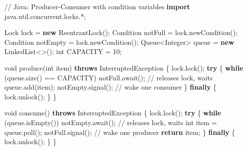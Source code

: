 \documentclass[11pt]{article}
\newenvironment{Shaded}{\begin{snugshade}}{\end{snugshade}}
\newcommand{\BuiltInTok}[1]{\textcolor[rgb]{0.50,0.55,0.55}{#1}}
\newcommand{\CommentTok}[1]{\textcolor[rgb]{0.48,0.49,0.49}{#1}}
\newcommand{\ControlFlowTok}[1]{\textcolor[rgb]{0.99,0.74,0.29}{\textbf{#1}}}
\newcommand{\DataTypeTok}[1]{\textcolor[rgb]{0.16,0.50,0.73}{#1}}
\newcommand{\DecValTok}[1]{\textcolor[rgb]{0.96,0.45,0.00}{#1}}
\newcommand{\FunctionTok}[1]{\textcolor[rgb]{0.56,0.27,0.68}{#1}}
\newcommand{\ImportTok}[1]{\textcolor[rgb]{0.15,0.68,0.38}{#1}}
\newcommand{\KeywordTok}[1]{\textcolor[rgb]{0.81,0.81,0.76}{\textbf{#1}}}
\newcommand{\NormalTok}[1]{\textcolor[rgb]{0.81,0.81,0.76}{#1}}
\newcommand{\OperatorTok}[1]{\textcolor[rgb]{0.81,0.81,0.76}{#1}}
\begin{document}

\begin{Shaded}
\begin{Highlighting}[]
\CommentTok{// Java: Producer{-}Consumer with condition variables}
\KeywordTok{import} \ImportTok{java}\OperatorTok{.}\ImportTok{util}\OperatorTok{.}\ImportTok{concurrent}\OperatorTok{.}\ImportTok{locks}\OperatorTok{.*;}

\BuiltInTok{Lock}\NormalTok{ lock }\OperatorTok{=} \KeywordTok{new} \BuiltInTok{ReentrantLock}\OperatorTok{();}
\BuiltInTok{Condition}\NormalTok{ notFull  }\OperatorTok{=}\NormalTok{ lock}\OperatorTok{.}\FunctionTok{newCondition}\OperatorTok{();}
\BuiltInTok{Condition}\NormalTok{ notEmpty }\OperatorTok{=}\NormalTok{ lock}\OperatorTok{.}\FunctionTok{newCondition}\OperatorTok{();}
\BuiltInTok{Queue}\OperatorTok{\textless{}}\BuiltInTok{Integer}\OperatorTok{\textgreater{}}\NormalTok{ queue }\OperatorTok{=} \KeywordTok{new} \BuiltInTok{LinkedList}\OperatorTok{\textless{}\textgreater{}();}
\DataTypeTok{int}\NormalTok{ CAPACITY }\OperatorTok{=} \DecValTok{10}\OperatorTok{;}

\DataTypeTok{void} \FunctionTok{produce}\OperatorTok{(}\DataTypeTok{int}\NormalTok{ item}\OperatorTok{)} \KeywordTok{throws} \BuiltInTok{InterruptedException} \OperatorTok{\{}
\NormalTok{    lock}\OperatorTok{.}\FunctionTok{lock}\OperatorTok{();}
    \ControlFlowTok{try} \OperatorTok{\{}
        \ControlFlowTok{while} \OperatorTok{(}\NormalTok{queue}\OperatorTok{.}\FunctionTok{size}\OperatorTok{()} \OperatorTok{==}\NormalTok{ CAPACITY}\OperatorTok{)}
\NormalTok{            notFull}\OperatorTok{.}\FunctionTok{await}\OperatorTok{();}       \CommentTok{// releases lock, waits}
\NormalTok{        queue}\OperatorTok{.}\FunctionTok{add}\OperatorTok{(}\NormalTok{item}\OperatorTok{);}
\NormalTok{        notEmpty}\OperatorTok{.}\FunctionTok{signal}\OperatorTok{();}         \CommentTok{// wake one consumer}
    \OperatorTok{\}} \ControlFlowTok{finally} \OperatorTok{\{}
\NormalTok{        lock}\OperatorTok{.}\FunctionTok{unlock}\OperatorTok{();}
    \OperatorTok{\}}
\OperatorTok{\}}

\DataTypeTok{void} \FunctionTok{consume}\OperatorTok{()} \KeywordTok{throws} \BuiltInTok{InterruptedException} \OperatorTok{\{}
\NormalTok{    lock}\OperatorTok{.}\FunctionTok{lock}\OperatorTok{();}
    \ControlFlowTok{try} \OperatorTok{\{}
        \ControlFlowTok{while} \OperatorTok{(}\NormalTok{queue}\OperatorTok{.}\FunctionTok{isEmpty}\OperatorTok{())}
\NormalTok{            notEmpty}\OperatorTok{.}\FunctionTok{await}\OperatorTok{();}      \CommentTok{// releases lock, waits}
        \DataTypeTok{int}\NormalTok{ item }\OperatorTok{=}\NormalTok{ queue}\OperatorTok{.}\FunctionTok{poll}\OperatorTok{();}
\NormalTok{        notFull}\OperatorTok{.}\FunctionTok{signal}\OperatorTok{();}          \CommentTok{// wake one producer}
        \ControlFlowTok{return}\NormalTok{ item}\OperatorTok{;}
    \OperatorTok{\}} \ControlFlowTok{finally} \OperatorTok{\{}
\NormalTok{        lock}\OperatorTok{.}\FunctionTok{unlock}\OperatorTok{();}
    \OperatorTok{\}}
\OperatorTok{\}}
\end{Highlighting}
\end{Shaded}
\end{document}
